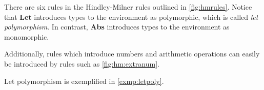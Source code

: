 There are six rules in the Hindley-Milner rules outlined in \autoref{fig:hmrules}.
Notice that \textbf{Let} introduces types to the environment as polymorphic, which is called \textit{let polymorphism}.
In contrast, \textbf{Abs} introduces types to the environment as monomorphic.

Additionally, rules which introduce numbers and arithmetic operations can easily be introduced by rules such as \autoref{fig:hm:extranum}.
\begin{figure}
  \begin{mdframed}
    \begin{subfigure}[b]{0.60\textwidth}
    \begin{prooftree}
    \end{prooftree}
    \end{subfigure}
    \begin{subfigure}[b]{0.38\textwidth}
    \begin{prooftree}
    \end{prooftree}
    \end{subfigure}
  \end{mdframed}
  \caption{}
  \label{fig:hm:extranum}
\end{figure}
Let polymorphism is exemplified in \autoref{exmp:letpoly}.

